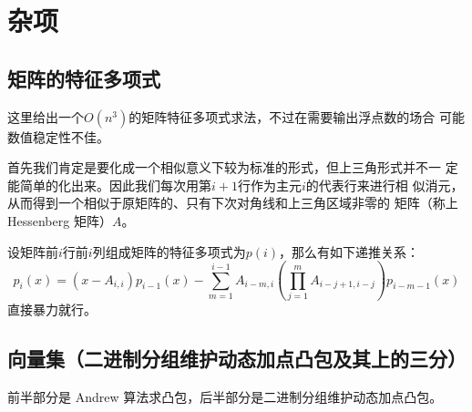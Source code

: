 \chapter{杂项}
\section{矩阵的特征多项式}
这里给出一个$O(n^3)$的矩阵特征多项式求法，不过在需要输出浮点数的场合
可能数值稳定性不佳。\par
首先我们肯定是要化成一个相似意义下较为标准的形式，但上三角形式并不一
定能简单的化出来。因此我们每次用第$i+1$行作为主元$i$的代表行来进行相
似消元，从而得到一个相似于原矩阵的、只有下次对角线和上三角区域非零的
矩阵（称上 Hessenberg 矩阵）$A$。\par
设矩阵前$i$行前$i$列组成矩阵的特征多项式为$p(i)$，那么有如下递推关系：
\[p_i(x)=(x-A_{i,i})p_{i-1}(x)-\sum_{m=1}^{i - 1}A_{i - m,i}(\prod_{j=1}^m A_{i-j+1,i-j}) p_{i - m - 1}(x)\]
直接暴力就行。


\section{向量集（二进制分组维护动态加点凸包及其上的三分）}
前半部分是 Andrew 算法求凸包，后半部分是二进制分组维护动态加点凸包。
